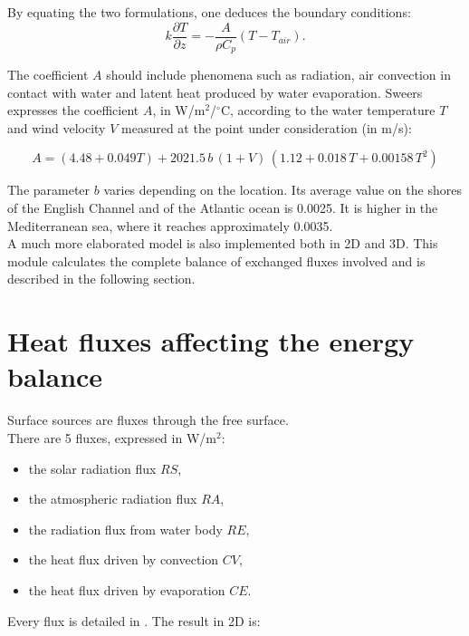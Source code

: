 By equating the two formulations, one deduces the boundary conditions:%
\begin{equation}
k\dfrac{\partial T}{\partial z}=-\dfrac{A}{\rho C_{p}}\left(
T-T_{air}\right).
\end{equation}

The coefficient $A$ should include phenomena such as radiation, air convection
in contact with water and latent heat produced by water evaporation. Sweers
\cite{sweers_wind_1976} expresses the coefficient $A$, in W/m$^{2}$/${^{\circ}}$C,
according to the water temperature $T$ and wind velocity $V$ measured
at the point under consideration (in m/s):

\begin{equation}
\label{sweers}A=(4.48+0.049T)+2021.5\,b\,(1+V)\,(1.12+0.018\,T+0.00158\,T^{2})
\end{equation}

The parameter $b$ varies depending on the location. Its average value on the
shores of the English Channel and of the Atlantic ocean is 0.0025. It is higher in the
Mediterranean sea, where it reaches approximately 0.0035.\\

A much more elaborated model is also implemented both in 2D and 3D.
This module calculates the complete balance of exchanged fluxes involved
and is described in the following section.

\section{Heat fluxes affecting the energy balance}

Surface sources are fluxes through the free surface.\\

There are 5 fluxes, expressed in W/m$^2$:

\begin{itemize}
\item the solar radiation flux $RS$,
\item the atmospheric radiation flux $RA$,
\item the radiation flux from water body $RE$,
\item the heat flux driven by convection $CV$,
\item the heat flux driven by evaporation $CE$.
\end{itemize}

Every flux is detailed in
\cite{gilbert_num_comp_nat_river_1986}. The result in 2D is:

